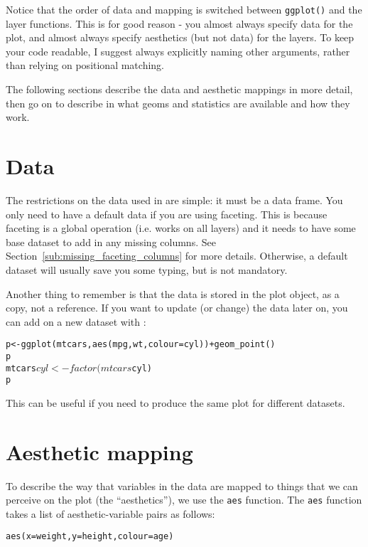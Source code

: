 Notice that the order of data and mapping is switched between {\tt ggplot()} and the layer functions.  This is for good reason - you almost always specify data for the plot, and almost always specify aesthetics (but not data) for the layers.  To keep your code readable, I suggest always explicitly naming other arguments, rather than relying on positional matching.

The following sections describe the data and aesthetic mappings in more detail, then go on to describe in what geoms and statistics are available and how they work.

\section{Data}
\label{sec:data}

The restrictions on the data used in \ggplot are simple: it must be a data frame.  You only need to have a default data if you are using faceting.  This is because faceting is a global operation (i.e. works on all layers) and it needs to have some base dataset to add in any missing columns.  See Section~\ref{sub:missing_faceting_columns} for more details.  Otherwise, a default dataset will usually save you some typing, but is not mandatory.

Another thing to remember is that the data is stored in the plot object, as a copy, not a reference.  If you want to update (or change) the data later on, you can add on a new dataset with \code{\%+\%}:

\begin{alltt}
p <- ggplot(mtcars, aes(mpg, wt, colour = cyl)) + geom_point()
p
mtcars$cyl <- factor(mtcars$cyl)
p %+% mtcars
\end{alltt}

\noindent This can be useful if you need to produce the same plot for different datasets.

\section{Aesthetic mapping}
\label{sec:aes}

To describe the way that variables in the data are mapped to things that we can perceive on the plot (the ``aesthetics''), we use the {\tt aes} function.  The {\tt aes} function takes a list of aesthetic-variable pairs as follows:

\begin{alltt}
aes(x = weight, y = height, colour = age)
\end{alltt}

